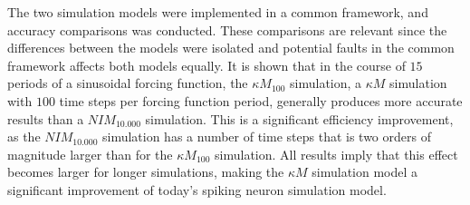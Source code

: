 	The two simulation models were implemented in a common framework, and accuracy comparisons was conducted. %
	These comparisons are relevant since the differences between the models were isolated and potential faults in the common framework affects both models equally.
	It is shown that in the course of $15$ periods  of a sinusoidal forcing function, the $\kappa M_{100}$ simulation, a $\kappa M$ simulation with $100$ time steps per forcing function period,
		generally produces more accurate results than a $NIM_{10.000}$ simulation.
	This is a significant efficiency improvement, as the $NIM_{10.000}$ simulation has a number of time steps that is two orders of magnitude larger than for the $\kappa M_{100}$ simulation.
	All results imply that this effect becomes larger for longer simulations, making the $\kappa M$ simulation model a significant improvement of today's spiking neuron simulation model.

%	



